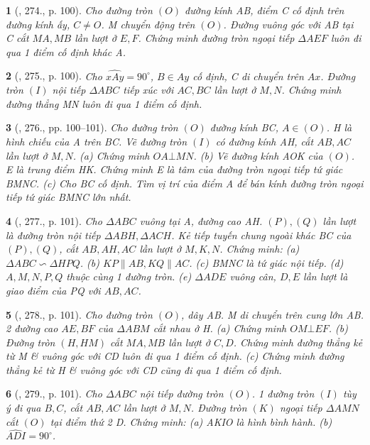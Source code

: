 \documentclass{article}
\newtheorem{baitoan}{}
\begin{document}
\begin{baitoan}[\cite{Binh_Toan_9_tap_2}, 274., p. 100]
	Cho đường tròn $(O)$ đường kính AB, điểm C cố định trên đường kính ấy, $C\ne O$. M chuyển động trên $(O)$. Đường vuông góc với AB tại C cắt $MA,MB$ lần lượt ở $E,F$. Chứng minh đường tròn ngoại tiếp $\Delta AEF$ luôn đi qua 1 điểm cố định khác A.
\end{baitoan}

\begin{baitoan}[\cite{Binh_Toan_9_tap_2}, 275., p. 100]
	Cho $\widehat{xAy} = 90^\circ$, $B\in Ay$ cố định, C di chuyển trên $Ax$. Đường tròn $(I)$ nội tiếp $\Delta ABC$ tiếp xúc với $AC,BC$ lần lượt ở $M,N$. Chứng minh đường thẳng MN luôn đi qua 1 điểm cố định.
\end{baitoan}

\begin{baitoan}[\cite{Binh_Toan_9_tap_2}, 276., pp. 100--101]
	Cho đường tròn $(O)$ đường kính BC, $A\in(O)$. H là hình chiếu của A trên BC. Vẽ đường tròn $(I)$ có đường kính AH, cắt $AB,AC$ lần lượt ở $M,N$. (a) Chứng minh $OA\bot MN$. (b) Vẽ đường kính AOK của $(O)$. E là trung điểm HK. Chứng minh E là tâm của đường tròn ngoại tiếp tứ giác BMNC. (c) Cho BC cố định. Tìm vị trí của điểm A để bán kính đường tròn ngoại tiếp tứ giác BMNC lớn nhất.
\end{baitoan}

\begin{baitoan}[\cite{Binh_Toan_9_tap_2}, 277., p. 101]
	Cho $\Delta ABC$ vuông tại A, đường cao AH. $(P),(Q)$ lần lượt là đường tròn nội tiếp $\Delta ABH,\Delta ACH$. Kẻ tiếp tuyến chung ngoài khác BC của $(P),(Q)$, cắt $AB,AH,AC$ lần lượt ở $M,K,N$. Chứng minh: (a) $\Delta ABC\backsim\Delta HPQ$. (b) $KP\parallel AB,KQ\parallel AC$. (c) BMNC là tứ giác nội tiếp. (d) $A,M,N,P,Q$ thuộc cùng 1 đường tròn. (e) $\Delta ADE$ vuông cân, $D,E$ lần lượt là giao điểm của PQ với $AB,AC$.
\end{baitoan}

\begin{baitoan}[\cite{Binh_Toan_9_tap_2}, 278., p. 101]
	Cho đường tròn $(O)$, dây AB. M di chuyển trên cung lớn AB. 2 đường cao $AE,BF$ của $\Delta ABM$ cắt nhau ở H. (a) Chứng minh $OM\bot EF$. (b) Đường tròn $(H,HM)$ cắt $MA,MB$ lần lượt ở $C,D$. Chứng minh đường thẳng kẻ từ M \& vuông góc với CD luôn đi qua 1 điểm cố định. (c) Chứng minh đường thẳng kẻ từ H \& vuông góc với CD cũng đi qua 1 điểm cố định.
\end{baitoan}

\begin{baitoan}[\cite{Binh_Toan_9_tap_2}, 279., p. 101]
	Cho $\Delta ABC$ nội tiếp đường tròn $(O)$. 1 đường tròn $(I)$ tùy ý đi qua $B,C$, cắt $AB,AC$ lần lượt ở $M,N$. Đường tròn $(K)$ ngoại tiếp $\Delta AMN$ cắt $(O)$ tại điểm thứ 2 D. Chứng minh: (a) AKIO là hình bình hành. (b) $\widehat{ADI} = 90^\circ$. 
\end{baitoan}
\end{document}
